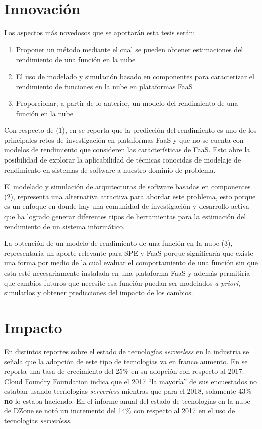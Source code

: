 \section{Innovación}
Los aspectos más novedosos que se aportarán esta tesis serán:
\begin{enumerate}
    \item Proponer un método mediante el cual se pueden obtener estimaciones del rendimiento de una función en la nube
    \item El uso de modelado y simulación basado en componentes para caracterizar el rendimiento de funciones en la nube en plataformas FaaS
    \item Proporcionar, a partir de lo anterior, un modelo del rendimiento de una función en la nube    
\end{enumerate}

Con respecto de (1), en \cite{vanEyk:2018:SRC:3185768.3186308} se reporta que la predicción del rendimiento es uno de los principales retos de investigación en plataformas FaaS y que no se cuenta con modelos de rendimiento que consideren las características de FaaS. Esto abre la posibilidad de explorar la aplicabilidad de técnicas conocidas de modelaje de rendimiento en sistemas de software a nuestro dominio de problema. 

El modelado y simulación de arquitecturas de software basadas en componentes (2), representa una alternativa atractiva para abordar este problema, esto porque es un enfoque en donde hay una comunidad de investigación y desarrollo activa que ha logrado generar diferentes tipos de herramientas para la estimación del rendimiento de un sistema informático. 

La obtención de un modelo de rendimiento de una función en la nube (3), representaría un aporte relevante para SPE y FaaS porque significaría que existe una forma por medio de la cual evaluar el comportamiento de una función sin que esta esté necesariamente instalada en una plataforma FaaS y además permitiría que cambios futuros que necesite esa función puedan ser modelados \emph{a priori}, simularlos y obtener predicciones del impacto de los cambios.



\section{Impacto}
En distintos reportes sobre el estado de tecnologías \emph{serverless} en la industria \cite{dzone-cloud-2018,rightscale-2018,digital-ocean-2018,pivotal-june-2018} se señala que la adopción de este tipo de tecnologías va en franco aumento. En \cite{rightscale-2018} se reporta una tasa de crecimiento del 25\% en su adopción con respecto al 2017. Cloud Foundry Foundation \cite{pivotal-june-2018} indica que el 2017 ``la mayoría'' de sus encuestados no estaban usando tecnologías \emph{serverless} mientras que para el 2018, solamente 43\% \textbf{no} lo estaba haciendo. En el informe anual del estado de tecnologías en la nube de DZone\cite{dzone-cloud-2018} se notó un incremento del 14\% con respecto al 2017 en el uso de tecnologías \emph{serverless}.

